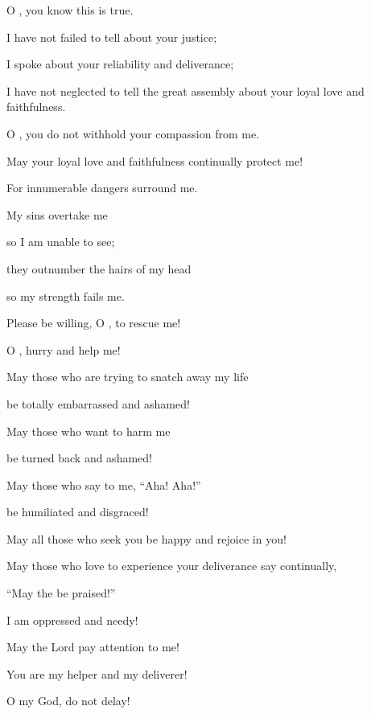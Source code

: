 {\par }{\Q O
{}, you
know this is true.
\par }{\Q {}I have not
failed
to tell about
your justice;
\par }{\Q I spoke about your reliability
and deliverance;
\par }{\Q I have not
neglected
to tell
the great
assembly
about your loyal love
and faithfulness.
\par }{\Q {}O
{}, you
do not
withhold
your compassion
from
me.
\par }{\Q May your loyal love
and faithfulness
continually
protect me!
\par }{\Q {}For
innumerable
dangers
surround
me.
\par }{\Q My sins
overtake
me
\par }{\Q so I am unable
to see;
\par }{\Q they outnumber
the hairs
of my head
\par }{\Q so my strength
fails me.
\par }{\Q {}Please be willing, O
{}, to rescue
me!
\par }{\Q O
{}, hurry
and help me!
\par }{\Q {}May those who are trying to snatch away
my life
\par }{\Q be totally
embarrassed
and ashamed!

\par }{\Q May those who want
to harm
me
\par }{\Q be turned
back
and ashamed!
\par }{\Q {}May those
who say to me, “Aha! Aha!”
\par }{\Q be humiliated
and disgraced!
\par }{\Q {}May all
those who seek
you be happy
and rejoice
in you!
\par }{\Q May those who love
to experience your deliverance
say
continually,
\par }{\Q “May the
{}
be praised!”
\par }{\Q {}I am
oppressed
and needy!

\par }{\Q May the Lord
pay attention
to me!

\par }{\Q You
are my helper
and my deliverer!
\par }{\Q O my God,
do not
delay!


\par }
